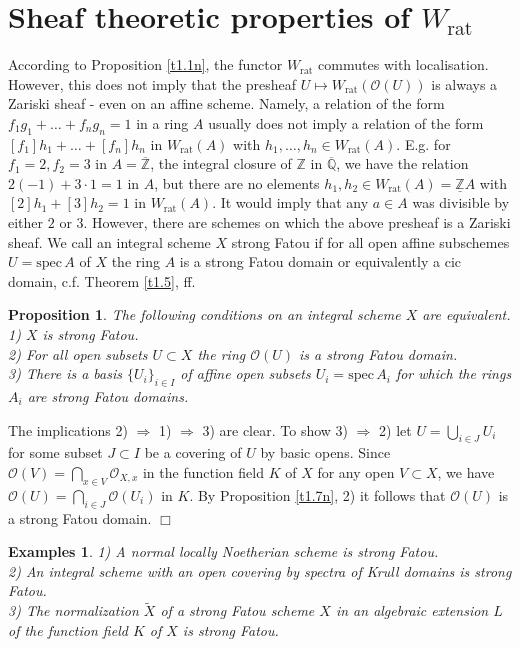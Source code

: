 \documentclass[12pt,leqno]{article}
\newcommand{\Q}{{\mathbb{Q}}}
\newcommand{\oQ}{\overline{\Q}}
\newcommand{\Z}{{\mathbb{Z}}}
\newcommand{\oZ}{\overline{\Z}}
\newcommand{\uZ}{\underline{\Z}}
\newcommand{\spec}{\mathrm{spec}\,}
\newcommand{\rat}{\mathrm{rat}}
\newcommand{\Oh}{{\mathcal O}}
\newtheorem{prop}[theorem]{Proposition}
\newtheorem{examples}[theorem]{Examples}
\newenvironment{proof}{\noindent {\bf Proof}}{\mbox{}\hspace*{\fill}$\Box$}
\newcommand{\tX}{\tilde{X}}
\begin{document}
\section{Sheaf theoretic properties of $W_{\rat}$} \label{sec:3}

According to Proposition \ref{t1.1n}, the functor $W_{\rat}$ commutes with localisation. However, this does not imply that the presheaf $U \mapsto W_{\rat} (\Oh (U))$ is always a Zariski sheaf - even on an affine scheme. Namely, a relation of the form $f_1 g_1 + \ldots + f_n g_n = 1$ in a ring $A$ usually does not imply a relation of the form $[f_1] h_1 + \ldots + [f_n] h_n$ in $W_{\rat} (A)$ with $h_1 , \ldots , h_n \in W_{\rat} (A)$. E.g. for $f_1 = 2 , f_2 = 3$ in $A = \oZ$, the integral closure of $\Z$ in $\oQ$, we have the relation $2 (-1) + 3 \cdot 1 = 1$ in $A$, but there are no elements $h_1 , h_2 \in W_{\rat} (A) = \uZ A$ with $[2] h_1 + [3] h_2 = 1$ in $W_{\rat} (A)$. It would imply that any $a \in A$ was divisible by either $2$ or $3$. However, there are schemes on which the above presheaf is a Zariski sheaf. We call an integral scheme $X$ strong Fatou if for all open affine subschemes $U = \spec A$ of $X$ the ring $A$ is a strong Fatou domain or equivalently a cic domain, c.f. Theorem \ref{t1.5}, ff.

\begin{prop}
\label{t3.1}
The following conditions on an integral scheme $X$ are equivalent.\\
1) $X$ is strong Fatou.\\
2) For all open subsets $U \subset X$ the ring $\Oh (U)$ is a strong Fatou domain.\\
3) There is a basis $\{ U_i \}_{i \in I}$ of affine open subsets $U_i = \spec A_i$ for which the rings $A_i$ are strong Fatou domains.
\end{prop}

\begin{proof}
The implications 2) $\Rightarrow$ 1) $\Rightarrow$ 3) are clear. To show 3) $\Rightarrow$ 2) let $U = \bigcup_{i \in J} U_i$ for some subset $J \subset I$ be a covering of $U$ by basic opens. Since $\Oh (V) = \bigcap_{x \in V} \Oh_{X,x}$ in the function field $K$ of $X$ for any open $V \subset X$, we have $\Oh (U) = \bigcap_{i \in J} \Oh (U_i)$ in $K$. By Proposition \ref{t1.7n}, 2) it follows that $\Oh (U)$ is a strong Fatou domain.
\end{proof}

\begin{examples} \label{t3.2}
1) A normal locally Noetherian scheme is strong Fatou.\\
2) An integral scheme with an open covering by spectra of Krull domains is strong Fatou.\\
3) The normalization $\tX$ of a strong Fatou scheme $X$ in an algebraic extension $L$ of the function field $K$ of $X$ is strong Fatou.
\end{examples}
\end{document}
